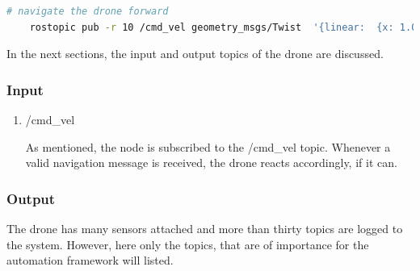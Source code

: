 	\begin{lstlisting}[language=bash, caption= Drone navigation command, label=lst:drone_cmd]
	# navigate the drone forward
    rostopic pub -r 10 /cmd_vel geometry_msgs/Twist  '{linear:  {x: 1.0, y: 0.0, z: 0.0}, angular: {x: 0.0,y: 0.0,z: 0.0}}'
	\end{lstlisting}
	
	In the next sections, the input and output topics of the drone are discussed. 
	
	\subsubsection{Input}
	
	\begin{enumerate}
	\item{/cmd\_vel}
	
	As mentioned, the node is subscribed to the /cmd\_vel topic. Whenever a valid navigation message is received, the drone reacts accordingly, 
	if it can. 
	
	\end{enumerate}
	
	\subsubsection{Output}\label{simout}
	
	The drone has many sensors attached and more than thirty topics are logged to the system. However, here only the topics, that are of importance 
	for the automation framework will listed. 
	
